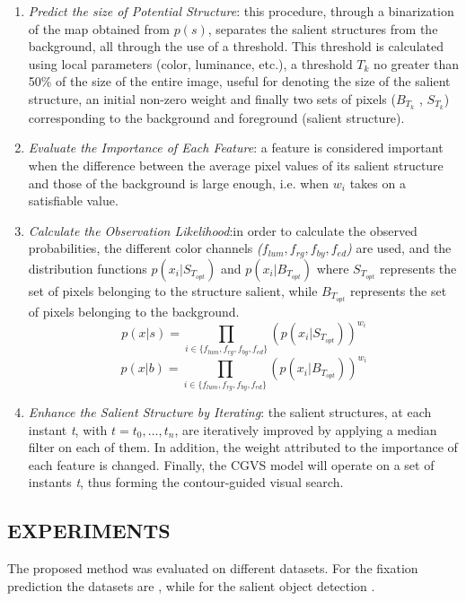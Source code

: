 \begin{enumerate}
    \item \emph{Predict the size of Potential Structure}: this procedure, through a binarization 
    of the map obtained from $ p(s) $, separates the salient structures 
    from the background, all through the use of a threshold. This 
    threshold is calculated using local parameters (color, luminance, etc.), 
    a threshold $ T_k $ no greater than 50\% of the size of the entire image, useful 
    for denoting the size of the salient structure, an initial non-zero 
    weight and finally two sets of pixels ($ B_{T_k}$ , $ S_{T_k}$) corresponding to the background 
    and foreground (salient structure).
    \item \emph{Evaluate the Importance of Each Feature}: a feature is considered important 
    when the difference between the average pixel values of its 
    salient structure and those of the background is large enough, i.e. when $ w_i $ 
    takes on a satisfiable value.
    \item \emph{Calculate the Observation Likelihood}:in order to calculate the observed 
    probabilities, the different color channels \emph{($ f_{lum}, f_{rg}, f_{by}, f_{ed} $)} are used, 
    and the distribution functions $ p(x_i | S_{T_{opt}}) $ and $ p(x_i | B_{T_{opt}}) $ where $ S_{T_{opt}} $ 
    represents the set of pixels belonging to the structure salient, while 
    $ B_{T_{opt}} $ represents the set of pixels belonging to the background.
    $$ p(x|s) = \prod_{i \in {\{} f_{lum}, f_{rg}, f_{by}, f_{ed} {\}}} {(p(x_i | S_{T_{opt}}))^{w_i}} $$
    $$ p(x|b) = \prod_{i \in {\{} f_{lum}, f_{rg}, f_{by}, f_{ed} {\}}} {(p(x_i | B_{T_{opt}}))^{w_i}} $$
    \item \emph{Enhance the Salient Structure by Iterating}: the salient structures, at 
    each instant \emph{t}, with $ t = t_0,…, t_n $, are iteratively improved by applying 
    a median filter on each of them. In addition, the weight attributed to 
    the importance of each feature is changed. Finally, the CGVS model 
    will operate on a set of instants \emph{t}, thus forming the contour-guided 
    visual search.
\end{enumerate}

\subsection{EXPERIMENTS}
The proposed method was evaluated on different datasets. For the fixation 
prediction the datasets are \cite{0747815530} \cite{0747815531} \cite{0747815579}, while for the salient object detection \cite{0747815506} \cite{0747815508} \cite{0747815518}.

